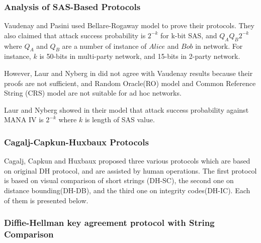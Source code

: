 \subsubsection*{Analysis of SAS-Based Protocols}

Vaudenay and Pasini used Bellare-Rogaway model to prove their protocols. They also claimed that attack success probability is $2^{-k}$ for k-bit SAS, and $Q_A Q_B 2^{-k}$ where $Q_A$ and $Q_B$ are a number of instance of $Alice$ and $Bob$ in network. For instance, $k$ is 50-bits in multi-party network, and 15-bits in 2-party network.

However, Laur and Nyberg in \cite{Laur:2006kl} did not agree with Vaudenay results because their proofs are not sufficient, and Random Oracle(RO) model and Common Reference String (CRS) model are not suitable for ad hoc networks.

Laur and Nyberg showed in their model that attack success probability against MANA IV is $2^ {-k}$ where $k$ is length of SAS value.

\subsubsection{Cagalj-Capkun-Huxbaux Protocols}

Cagalj, Capkun and Huxbaux \cite{1580514} proposed three various protocols which are based on original DH protocol, and are assisted by human operations. The first protocol is based on visual comparison of short strings (DH-SC), the second one on distance bounding(DH-DB), and the third one on integrity codes(DH-IC). Each of them is presented below. 
 
\subsubsection*{Diffie-Hellman key agreement protocol with String Comparison}

